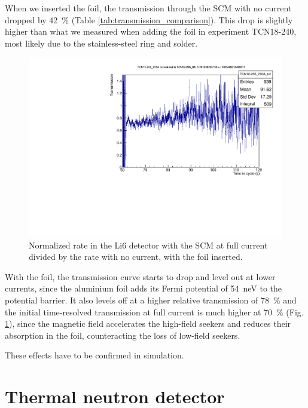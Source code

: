 \documentclass[10pt,letterpaper]{article}
\begin{document}
When we inserted the foil, the transmission through the SCM with no current dropped by \SI{42}{\percent} (Table \ref{tab:transmission_comparison}). This drop is slightly higher than what we measured when adding the foil in experiment TCN18-240, most likely due to the stainless-steel ring and solder.

\begin{figure}
\centering
\includegraphics[width=\textwidth,page=1]{../transmission/TCN18-265_200A_TCN18-265_0A.pdf}
\caption{Normalized rate in the Li6 detector with the SCM at full current divided by the rate with no current, with the foil inserted.}
\label{fig:SCMtof_foil}
\end{figure}

With the foil, the transmission curve starts to drop and level out at lower currents, since the aluminium foil adds its Fermi potential of \SI{54}{\nano\electronvolt} to the potential barrier. It also levels off at a higher relative transmission of \SI{78}{\percent} and the initial time-resolved transmission at full current is much higher at \SI{70}{\percent} (Fig. \ref{fig:SCMtof_foil}), since the magnetic field accelerates the high-field seekers and reduces their absorption in the foil, counteracting the loss of low-field seekers.

These effects have to be confirmed in simulation.




\section{Thermal neutron detector}
\end{document}
